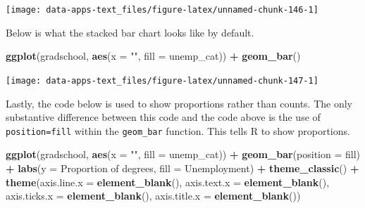 \documentclass[
]{book}
\makeatletter
\newenvironment{Shaded}{\begin{snugshade}}{\end{snugshade}}
\newcommand{\AttributeTok}[1]{\textcolor[rgb]{0.27,0.27,0.27}{#1}}
\newcommand{\FunctionTok}[1]{\textcolor[rgb]{0.27,0.27,0.27}{\textbf{#1}}}
\newcommand{\NormalTok}[1]{#1}
\newcommand{\SpecialCharTok}[1]{\textcolor[rgb]{0.43,0.43,0.43}{\textbf{#1}}}
\newcommand{\StringTok}[1]{\textcolor[rgb]{0.5,0.5,0.5}{#1}}
\newenvironment{kframe}{%
\medskip{}
\setlength{\fboxsep}{.8em}
 \def\at@end@of@kframe{}%
 \ifinner\ifhmode%
  \def\at@end@of@kframe{\end{minipage}}%
  \begin{minipage}{\columnwidth}%
 \fi\fi%
 \def\FrameCommand##1{\hskip\@totalleftmargin \hskip-\fboxsep
 \colorbox{shadecolor}{##1}\hskip-\fboxsep
     \hskip-\linewidth \hskip-\@totalleftmargin \hskip\columnwidth}%
 \MakeFramed {\advance\hsize-\width
   \@totalleftmargin\z@ \linewidth\hsize
   \@setminipage}}%
 {\par\unskip\endMakeFramed%
 \at@end@of@kframe}
\renewenvironment{Shaded}{\begin{kframe}}{\end{kframe}}
\makeatother
\begin{document}
\begin{center}\texttt{[image: data-apps-text\_files/figure-latex/unnamed-chunk-146-1]} \end{center}

Below is what the stacked bar chart looks like by default.

\begin{Shaded}
\begin{Highlighting}[]
\FunctionTok{ggplot}\NormalTok{(gradschool, }\FunctionTok{aes}\NormalTok{(}\AttributeTok{x =} \StringTok{""}\NormalTok{, }\AttributeTok{fill =}\NormalTok{ unemp\_cat)) }\SpecialCharTok{+}
  \FunctionTok{geom\_bar}\NormalTok{()}
\end{Highlighting}
\end{Shaded}

\begin{center}\texttt{[image: data-apps-text\_files/figure-latex/unnamed-chunk-147-1]} \end{center}

Lastly, the code below is used to show proportions rather than counts. The only substantive difference between this code and the code above is the use of \texttt{position=\textquotesingle{}fill\textquotesingle{}} within the \texttt{geom\_bar} function. This tells R to show proportions.

\begin{Shaded}
\begin{Highlighting}[]
\FunctionTok{ggplot}\NormalTok{(gradschool, }\FunctionTok{aes}\NormalTok{(}\AttributeTok{x =} \StringTok{""}\NormalTok{, }\AttributeTok{fill =}\NormalTok{ unemp\_cat)) }\SpecialCharTok{+}
  \FunctionTok{geom\_bar}\NormalTok{(}\AttributeTok{position =} \StringTok{\textquotesingle{}fill\textquotesingle{}}\NormalTok{) }\SpecialCharTok{+}
  \FunctionTok{labs}\NormalTok{(}\AttributeTok{y =} \StringTok{\textquotesingle{}Proportion of degrees\textquotesingle{}}\NormalTok{,}
       \AttributeTok{fill =} \StringTok{\textquotesingle{}Unemployment\textquotesingle{}}\NormalTok{) }\SpecialCharTok{+}
  \FunctionTok{theme\_classic}\NormalTok{() }\SpecialCharTok{+}
  \FunctionTok{theme}\NormalTok{(}\AttributeTok{axis.line.x =} \FunctionTok{element\_blank}\NormalTok{(),}
        \AttributeTok{axis.text.x =} \FunctionTok{element\_blank}\NormalTok{(),}
        \AttributeTok{axis.ticks.x =} \FunctionTok{element\_blank}\NormalTok{(),}
        \AttributeTok{axis.title.x =} \FunctionTok{element\_blank}\NormalTok{())}
\end{Highlighting}
\end{Shaded}
\end{document}
